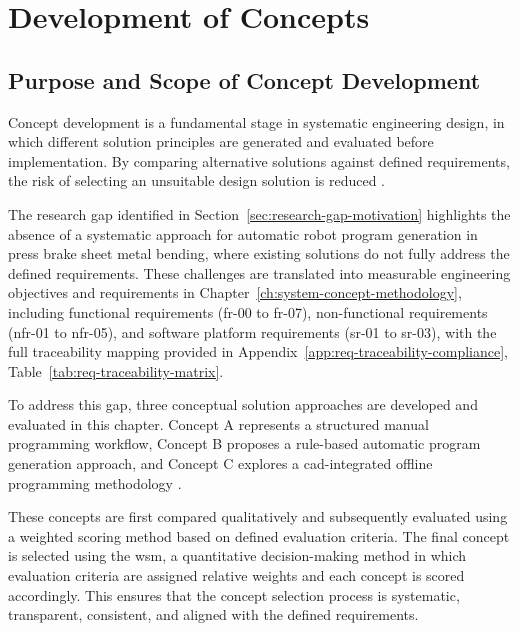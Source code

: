 ﻿
\chapter{Development of Concepts}
\label{ch:development-concepts}

\section{Purpose and Scope of Concept Development}
\label{sec:purpose-scope-concept-development}

Concept development is a fundamental stage in systematic engineering design, in which different solution principles are generated and evaluated before implementation. By comparing alternative solutions against defined requirements, the risk of selecting an unsuitable design solution is reduced \cite{Pahl2007EngineeringDesign}.

The research gap identified in Section~\ref{sec:research-gap-motivation} highlights the absence of a systematic approach for automatic robot program generation in press brake sheet metal bending, where existing solutions do not fully address the defined requirements. These challenges are translated into measurable engineering objectives and requirements in Chapter~\ref{ch:system-concept-methodology}, including functional requirements (\acs{fr}-00 to \acs{fr}-07), non-functional requirements (\acs{nfr}-01 to \acs{nfr}-05), and software platform requirements (\acs{sr}-01 to \acs{sr}-03), with the full traceability mapping provided in Appendix~\ref{app:req-traceability-compliance}, Table~\ref{tab:req-traceability-matrix}.

To address this gap, three conceptual solution approaches are developed and evaluated in this chapter. Concept A represents a structured manual programming workflow, Concept B proposes a rule-based automatic program generation approach, and Concept C explores a \acs{cad}-integrated offline programming methodology \cite{Pan2012Survey,Siciliano2016Robotics}.

These concepts are first compared qualitatively and subsequently evaluated using a weighted scoring method based on defined evaluation criteria. The final concept is selected using the \ac{wsm}, a quantitative decision-making method in which evaluation criteria are assigned relative weights and each concept is scored accordingly. This ensures that the concept selection process is systematic, transparent, consistent, and aligned with the defined requirements.

